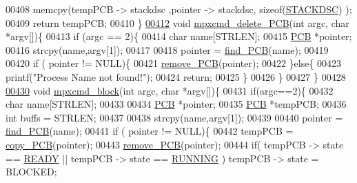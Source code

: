 \begin{DoxyCode}
{{00408                 memcpy(tempPCB -> stackdsc ,pointer -> stackdsc, \textcolor{keyword}{sizeof}(\hyperlink{structstack}{STACKDSC})
      );
00409         \textcolor{keywordflow}{return} tempPCB;
00410 \}
\hypertarget{mpx__r2_8c_source_l00412}{}\hyperlink{mpx__r2_8h_ae6d6afa9fefa158029528a24841c453a}{00412} \textcolor{keywordtype}{void} \hyperlink{mpx__r2_8c_ae6d6afa9fefa158029528a24841c453a}{mpxcmd_delete_PCB}(\textcolor{keywordtype}{int} argc, \textcolor{keywordtype}{char} *argv[])\{
00413         \textcolor{keywordflow}{if} (argc == 2)\{
00414         \textcolor{keywordtype}{char} name[STRLEN];
00415         \hyperlink{structprocess}{PCB} *pointer;
00416         strcpy(name,argv[1]);
00417         
00418         pointer = \hyperlink{mpx__r2_8c_a612a6abcb66c688a32f33abc93ff3990}{find_PCB}(name);
00419         
00420         \textcolor{keywordflow}{if} ( pointer != NULL)\{
00421                 \hyperlink{mpx__r2_8c_af30a3658210d449b4b53e5be2ed2bc2e}{remove_PCB}(pointer);
00422         \}\textcolor{keywordflow}{else}\{
00423                 printf(\textcolor{stringliteral}{"Process Name not found!"});
00424                 \textcolor{keywordflow}{return};
00425         \}
00426         \}
00427 \}
00428 
\hypertarget{mpx__r2_8c_source_l00430}{}\hyperlink{mpx__r2_8h_ae8eb72663ecff92c27ab06e3560fd0d4}{00430} \textcolor{keywordtype}{void} \hyperlink{mpx__r2_8c_ae8eb72663ecff92c27ab06e3560fd0d4}{mpxcmd_block}(\textcolor{keywordtype}{int} argc, \textcolor{keywordtype}{char} *argv[])\{
00431         \textcolor{keywordflow}{if}(argc==2)\{
00432                 \textcolor{keywordtype}{char} name[STRLEN];
00433                 
00434                 \hyperlink{structprocess}{PCB} *pointer;
00435                 \hyperlink{structprocess}{PCB} *tempPCB;
00436                 \textcolor{keywordtype}{int} buffs = STRLEN;
00437                 
00438                 strcpy(name,argv[1]);
00439                 
00440                 pointer = \hyperlink{mpx__r2_8c_a612a6abcb66c688a32f33abc93ff3990}{find_PCB}(name);
00441                 \textcolor{keywordflow}{if} ( pointer != NULL)\{
00442                         tempPCB = \hyperlink{mpx__r2_8c_aca3ad02d2b4c68f7653b0adf2c484ff6}{copy_PCB}(pointer);
00443                         \hyperlink{mpx__r2_8c_af30a3658210d449b4b53e5be2ed2bc2e}{remove_PCB}(pointer);
00444                         \textcolor{keywordflow}{if}( tempPCB -> state == \hyperlink{mpx__r2_8h_ad1235d5ce36f7267285e82dccd428aa6}{READY} || tempPCB -> state == 
      \hyperlink{mpx__r2_8h_a6fb7181d994ee98e735494be55809708}{RUNNING} ) tempPCB -> state = BLOCKED;
}}
\end{DoxyCode}

